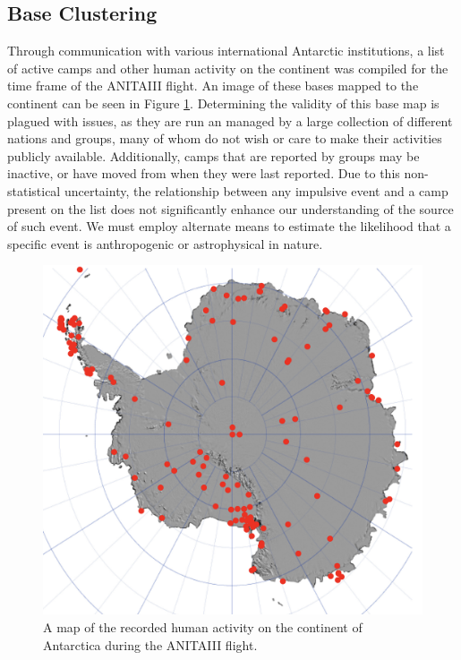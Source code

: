 	\subsection{Base Clustering}
		Through communication with various international Antarctic institutions, a list of active camps and other human activity on the continent was compiled for the time frame of the ANITAIII flight.  An image of these bases mapped to the continent can be seen in Figure \ref{fig:BaseMap}.  Determining the validity of this base map is plagued with issues, as they are run an managed by a large collection of different nations and groups, many of whom do not wish or care to make their activities publicly available.  Additionally, camps that are reported by groups may be inactive, or have moved from when they were last reported.  Due to this non-statistical uncertainty, the relationship between any impulsive event and a camp present on the list does not significantly enhance our understanding of the source of such event.  We must employ alternate means to estimate the likelihood that a specific event is anthropogenic or astrophysical in nature.
		
\begin{figure}
	\includegraphics[width=\textwidth]{figures/BaseMap}
	\caption{A map of the recorded human activity on the continent of Antarctica during the ANITAIII flight.}
	\label{fig:BaseMap}
\end{figure}	
	
